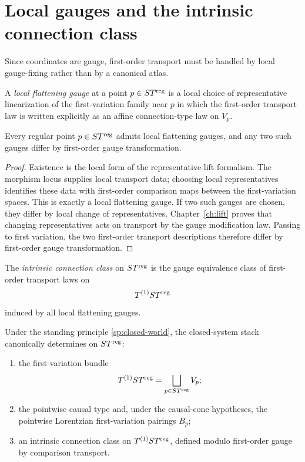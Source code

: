 \section{Local gauges and the intrinsic connection class}
\label{sec:intrinsic-connection-class}
Since coordinates are gauge, first-order transport must be handled by
local gauge-fixing rather than by a canonical atlas.
\begin{definition}
	A \emph{local flattening gauge} at a point \(p\in ST^{\mathrm{reg}}\) is a local
	choice of representative linearization of the first-variation family
	near \(p\) in which the first-order transport law is written explicitly
	as an affine connection-type law on \(V_p\).
\end{definition}
\begin{proposition}
	\label{prop:connection-flattening-gauges}
	Every regular point \(p\in ST^{\mathrm{reg}}\) admits local flattening gauges,
	and any two such gauges differ by first-order gauge transformation.
\end{proposition}
\begin{proof}
	Existence is the local form of the representative-lift formalism.  The
	morphism locus supplies local transport data; choosing local
	representatives identifies these data with first-order comparison maps
	between the first-variation spaces.  This is exactly a local flattening
	gauge.
	If two such gauges are chosen, they differ by local change of
	representatives.  Chapter~\ref{ch:lift} proves that changing
	representatives acts on transport by the gauge modification law.
	Passing to first variation, the two first-order transport descriptions
	therefore differ by first-order gauge transformation.
\end{proof}
\begin{definition}
	The \emph{intrinsic connection class} on \(ST^{\mathrm{reg}}\) is the gauge
	equivalence class of first-order transport laws on
	\[
		T^{(1)}ST^{\mathrm{reg}}
	\]
	induced by all local flattening gauges.
\end{definition}
\begin{theorem}
	\label{thm:connection-first-reconstruction}
	Under the standing principle \cref{sp:closed-world}, the closed-system
	stack canonically determines on \(ST^{\mathrm{reg}}\):
	\begin{enumerate}[label=\textup{(\roman*)}]
		\item
		      the first-variation bundle
		      \[
			      T^{(1)}ST^{\mathrm{reg}}
			      =
			      \bigsqcup_{p\in ST^{\mathrm{reg}}}V_p;
		      \]
		\item
		      the pointwise causal type and, under the causal-cone hypotheses, the
		      pointwise Lorentzian first-variation pairings \(B_p\);
		\item
		      an intrinsic connection class on \(T^{(1)}ST^{\mathrm{reg}}\), defined modulo
		      first-order gauge by comparison transport.
	\end{enumerate}
\end{theorem}
